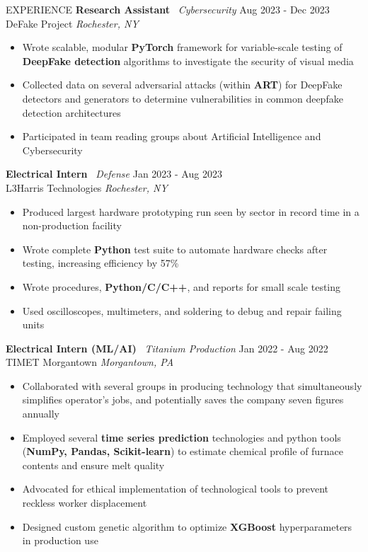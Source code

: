 \documentclass{resume} %
\begin{document}
\begin{rSection}{EXPERIENCE}
\textbf{Research Assistant} \textbar\ \textit{Cybersecurity} \hfill Aug 2023 - Dec 2023\\
DeFake Project \hfill \textit{Rochester, NY}
\begin{itemize}
\itemsep-3pt {}
    \item Wrote scalable, modular \textbf{PyTorch} framework for variable-scale testing of \textbf{DeepFake detection} algorithms to investigate the security of visual media
    \item Collected data on several adversarial attacks (within \textbf{ART}) for DeepFake detectors and generators to determine vulnerabilities in common deepfake detection architectures
    \item Participated in team reading groups about Artificial Intelligence and Cybersecurity
\end{itemize}

\textbf{Electrical Intern} \textbar\ \textit{Defense} \hfill Jan 2023 - Aug 2023\\
L3Harris Technologies \hfill \textit{Rochester, NY}
\begin{itemize}
\itemsep-3pt {}
    \item Produced largest hardware prototyping run seen by sector in record time in a non-production facility
    \item Wrote complete \textbf{Python} test suite to automate hardware checks after testing, increasing efficiency by 57\%
    \item Wrote procedures, \textbf{Python/C/C++}, and reports for small scale testing
    \item Used oscilloscopes, multimeters, and soldering to debug and repair failing units
\end{itemize}

    \textbf{Electrical Intern (ML/AI)} \textbar\ \textit{Titanium Production} \hfill Jan 2022 - Aug 2022\\
TIMET Morgantown \hfill \textit{Morgantown, PA}
\begin{itemize}
    \itemsep-3pt {}
    \item Collaborated with several groups in producing technology that simultaneously simplifies operator’s jobs, and potentially saves the company seven figures annually
    \item Employed several \textbf{time series prediction} technologies and python tools (\textbf{NumPy, Pandas, Scikit-learn}) to estimate chemical profile of furnace contents and ensure melt quality
    \item Advocated for ethical implementation of technological tools to prevent reckless worker displacement
    \item Designed custom genetic algorithm to optimize \textbf{XGBoost} hyperparameters in production use
\end{itemize}

\end{rSection} 
\end{document}
